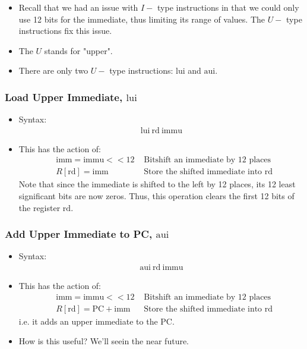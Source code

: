 \documentclass[11pt]{article}
\begin{document}
\begin{itemize}
  \item Recall that we had an issue with $I-$ type instructions in that we could only use 12 bits for the immediate, thus limiting its range of values. The $U-$ type instructions fix this issue.
  \item The $U$ stands for "upper".
  \item There are only two $U-$ type instructions: $\mathrm{lui}$ and $\mathrm{aui}$.
\end{itemize}

\subsubsection{Load Upper Immediate, $\mathrm{lui}$}
\begin{itemize}
  \item Syntax:
  \begin{align*}
    \mathrm{lui} ~ \mathrm{rd} ~ \mathrm{immu}
  \end{align*} 
  \item This has the action of: 
  \begin{align*}
    &\mathrm{imm} = \mathrm{immu} << 12  &\text{ Bitshift an immediate by 12 places } \\ 
    &R[\mathrm{rd}] = \mathrm{imm}  &\text{ Store the shifted immediate into rd}
  \end{align*}
  Note that since the immediate is shifted to the left by 12 places, its 12 least significant bits are now zeros. Thus, this operation clears the first 12 bits of the register $\mathrm{rd}$.
\end{itemize}

\subsubsection{Add Upper Immediate to PC, $\mathrm{aui}$}

\begin{itemize}
  \item Syntax: 
  \begin{align*}
    \mathrm{aui} ~ \mathrm{rd} ~ \mathrm{immu}
  \end{align*}
  \item This has the action of: 
  \begin{align*}
    &\mathrm{imm} = \mathrm{immu} << 12  &\text{ Bitshift an immediate by 12 places } \\ 
    &R[\mathrm{rd}] = \mathrm{PC} + \mathrm{imm}  &\text{ Store the shifted immediate into rd}
  \end{align*} i.e. it adds an upper immediate to the PC.

  \item How is this useful? We'll seein the near future.
\end{itemize}
\end{document}
